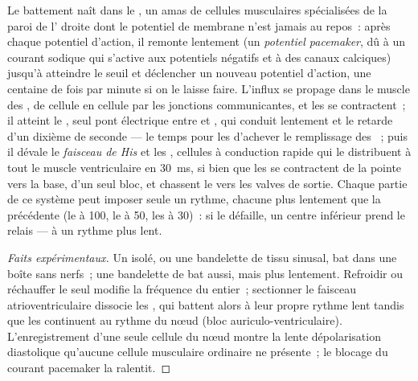 \begin{proposition}\label{prop:b2:heart:conduction}
Le battement naît dans le \emph{}, un amas de cellules
musculaires spécialisées de la paroi de l' droite dont le
potentiel de membrane n'est jamais au repos~: après chaque potentiel
d'action, il remonte lentement (un \emph{potentiel pacemaker}, dû à un
courant sodique qui s'active aux potentiels négatifs et à des canaux
calciques) jusqu'à atteindre le seuil et déclencher un nouveau
potentiel d'action, une centaine de fois par minute si on le laisse
faire. L'influx se propage dans le muscle des , de cellule en
cellule par les jonctions communicantes, et les  se
contractent~; il atteint le \emph{}, seul pont
électrique entre  et , qui conduit lentement et le
retarde d'un dixième de seconde --- le temps pour les 
d'achever le remplissage des ~; puis il dévale le
\emph{faisceau de His} et les \emph{}, cellules à
conduction rapide qui le distribuent à tout le muscle ventriculaire en
\qty{30}{ms}, si bien que les  se contractent de la pointe
vers la base, d'un seul bloc, et chassent le  vers les valves de
sortie. Chaque partie de ce système peut imposer seule un rythme, chacune
plus lentement que la précédente (le  à 100, le  à 50, les  à 30)~: si le  défaille, un centre inférieur prend le relais --- à un rythme
plus lent.
\end{proposition}
\begin{proof}[Faits expérimentaux]
Un  isolé, ou une bandelette de tissu sinusal, bat dans une boîte
sans nerfs~; une bandelette de  bat aussi, mais plus
lentement. Refroidir ou réchauffer le seul  modifie la
fréquence du  entier~; sectionner le faisceau atrioventriculaire
dissocie les , qui battent alors à leur propre rythme lent
tandis que les  continuent au rythme du nœud (bloc
auriculo-ventriculaire). L'enregistrement d'une seule cellule du nœud
montre la lente dépolarisation diastolique qu'aucune cellule musculaire
ordinaire ne présente~; le blocage du courant pacemaker la ralentit.
\end{proof}

